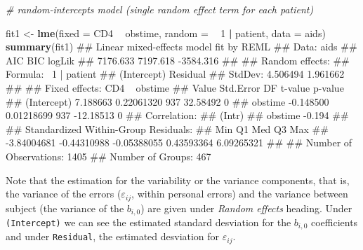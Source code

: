 \documentclass[]{book}
\makeatletter
\newenvironment{Shaded}{\begin{snugshade}}{\end{snugshade}}
\newcommand{\KeywordTok}[1]{\textcolor[rgb]{0.13,0.29,0.53}{\textbf{#1}}}
\newcommand{\DataTypeTok}[1]{\textcolor[rgb]{0.13,0.29,0.53}{#1}}
\newcommand{\DecValTok}[1]{\textcolor[rgb]{0.00,0.00,0.81}{#1}}
\newcommand{\StringTok}[1]{\textcolor[rgb]{0.31,0.60,0.02}{#1}}
\newcommand{\CommentTok}[1]{\textcolor[rgb]{0.56,0.35,0.01}{\textit{#1}}}
\newcommand{\OperatorTok}[1]{\textcolor[rgb]{0.81,0.36,0.00}{\textbf{#1}}}
\newcommand{\NormalTok}[1]{#1}
\newenvironment{kframe}{%
\medskip{}
\setlength{\fboxsep}{.8em}
 \def\at@end@of@kframe{}%
 \ifinner\ifhmode%
  \def\at@end@of@kframe{\end{minipage}}%
  \begin{minipage}{\columnwidth}%
 \fi\fi%
 \def\FrameCommand##1{\hskip\@totalleftmargin \hskip-\fboxsep
 \colorbox{shadecolor}{##1}\hskip-\fboxsep
     \hskip-\linewidth \hskip-\@totalleftmargin \hskip\columnwidth}%
 \MakeFramed {\advance\hsize-\width
   \@totalleftmargin\z@ \linewidth\hsize
   \@setminipage}}%
 {\par\unskip\endMakeFramed%
 \at@end@of@kframe}
\renewenvironment{Shaded}{\begin{kframe}}{\end{kframe}}
\theoremstyle{definition}
\theoremstyle{definition}
\theoremstyle{definition}
\theoremstyle{remark}
\makeatother
\begin{document}
\begin{Shaded}
\begin{Highlighting}[]
\CommentTok{# random-intercepts model (single random effect term for each patient)}

\NormalTok{fit1 <-}\StringTok{ }\KeywordTok{lme}\NormalTok{(}\DataTypeTok{fixed =}\NormalTok{ CD4 }\OperatorTok{~}\StringTok{ }\NormalTok{obstime, }\DataTypeTok{random =} \OperatorTok{~}\StringTok{ }\DecValTok{1} \OperatorTok{|}\StringTok{ }\NormalTok{patient, }\DataTypeTok{data =}\NormalTok{ aids)}
\KeywordTok{summary}\NormalTok{(fit1)}
\NormalTok{## Linear mixed-effects model fit by REML}
\NormalTok{##  Data: aids }
\NormalTok{##        AIC      BIC    logLik}
\NormalTok{##   7176.633 7197.618 -3584.316}
\NormalTok{## }
\NormalTok{## Random effects:}
\NormalTok{##  Formula: ~1 | patient}
\NormalTok{##         (Intercept) Residual}
\NormalTok{## StdDev:    4.506494 1.961662}
\NormalTok{## }
\NormalTok{## Fixed effects: CD4 ~ obstime }
\NormalTok{##                 Value  Std.Error  DF   t-value p-value}
\NormalTok{## (Intercept)  7.188663 0.22061320 937  32.58492       0}
\NormalTok{## obstime     -0.148500 0.01218699 937 -12.18513       0}
\NormalTok{##  Correlation: }
\NormalTok{##         (Intr)}
\NormalTok{## obstime -0.194}
\NormalTok{## }
\NormalTok{## Standardized Within-Group Residuals:}
\NormalTok{##         Min          Q1         Med          Q3         Max }
\NormalTok{## -3.84004681 -0.44310988 -0.05388055  0.43593364  6.09265321 }
\NormalTok{## }
\NormalTok{## Number of Observations: 1405}
\NormalTok{## Number of Groups: 467}
\end{Highlighting}
\end{Shaded}

Note that the estimation for the variability or the variance components,
that is, the variance of the errors (\(\varepsilon_{ij}\), within
personal errors) and the variance between subject (the variance of the
\(b_{i, 0}\)) are given under \emph{Random effects} heading. Under
\texttt{(Intercept)} we can see the estimated standard desviation for
the \(b_{i,0}\) coefficients and under \texttt{Residual}, the estimated
desviation for \(\varepsilon_{ij}\).
\end{document}
